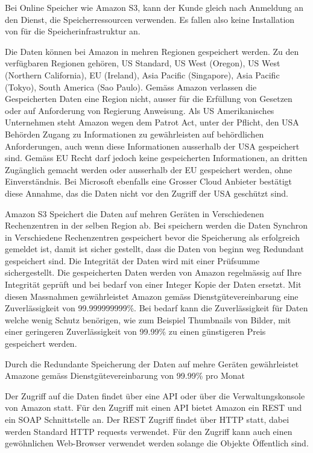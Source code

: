 Bei Online Speicher wie Amazon S3, kann der Kunde gleich nach Anmeldung an den Dienst, die Speicherressourcen verwenden. Es fallen also keine Installation von für
die Speicherinfrastruktur an. 

Die Daten können bei Amazon in mehren Regionen gespeichert werden. Zu den verfügbaren Regionen gehören, US Standard, US West (Oregon), US West (Northern California), EU (Ireland), Asia Pacific (Singapore), Asia Pacific (Tokyo), South America (Sao Paulo). Gemäss Amazon verlassen die Gespeicherten Daten eine Region nicht, ausser für die Erfüllung von Gesetzen oder auf Anforderung von Regierung Anweisung. Als US Amerikanisches Unternehmen steht Amazon wegen dem Patrot Act, unter der Pflicht, den USA Behörden Zugang zu Informationen zu gewährleisten auf behördlichen Anforderungen, auch wenn diese Informationen ausserhalb der USA gespeichert sind. Gemäss EU Recht darf jedoch keine gespeicherten Informationen, an dritten Zugänglich gemacht werden oder ausserhalb der EU gespeichert werden, ohne Einverständnis. Bei Microsoft ebenfalls eine Grosser Cloud Anbieter bestätigt diese Annahme, das die Daten nicht vor den Zugriff der USA geschützt sind.\cite{Amazon2012}\cite{Ostler}

Amazon S3 Speichert die Daten auf mehren Geräten in Verschiedenen Rechenzentren in der selben Region ab. Bei speichern werden die Daten Synchron in Verschiedene Rechenzentren gespeichert bevor die Speicherung als erfolgreich gemeldet ist, damit ist sicher gestellt, dass die Daten von beginn weg Redundant gespeichert sind. Die Integrität der Daten wird mit einer Prüfsumme sichergestellt. Die gespeicherten Daten werden von Amazon regelmässig auf Ihre Integrität geprüft und bei bedarf von einer Integer Kopie der Daten ersetzt. Mit diesen Massnahmen gewährleistet Amazon gemäss Dienstgütevereinbarung eine Zuverlässigkeit von 99.999999999\%. Bei bedarf kann die Zuverlässigkeit für Daten welche wenig Schutz benörigen, wie zum Beispiel Thumbnails von Bilder, mit einer geringeren Zuverlässigkeit von 99.99\% zu einen günstigeren Preis gespeichert werden.\cite{Amazon2007}

Durch die Redundante Speicherung der Daten auf mehre Geräten gewährleistet Amazone gemäss Dienstgütevereinbarung von 99.99\% pro Monat

Der Zugriff auf die Daten findet über eine API oder über die Verwaltungskonsole von Amazon statt. Für den Zugriff mit einen API bietet Amazon ein \gls{REST} und ein \gls{SOAP} Schnittstelle an. Der \gls{REST} Zugriff findet über HTTP statt, dabei werden Standard HTTP requests verwendet. Für den Zugriff kann auch einen gewöhnlichen Web-Browser verwendet werden solange die Objekte Öffentlich sind.

